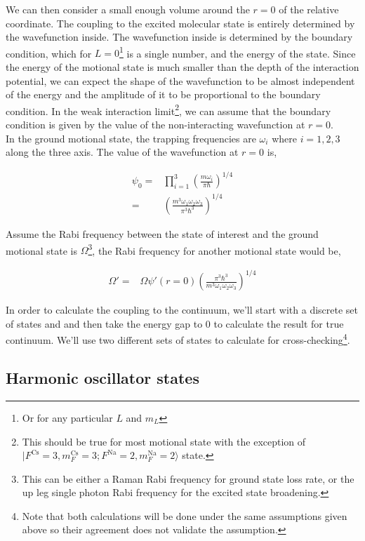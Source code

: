 \documentclass[10pt,fleqn]{article}
\newcommand{\eqar}[1]
{
  \begin{align*}
    #1
  \end{align*}
}
\newcommand{\paren}[1]{{\left({#1}\right)}}
\begin{document}
We can then consider a small enough volume around the $r=0$ of the relative coordinate.
The coupling to the excited molecular state is entirely determined by the wavefunction
inside. The wavefunction inside is determined by the boundary condition,
which for $L=0$\footnote{Or for any particular $L$ and $m_L$} is a single number,
and the energy of the state. Since the energy of the motional state is much smaller than
the depth of the interaction potential, we can expect the shape of the wavefunction
to be almost independent of the energy and the amplitude of it to be proportional to
the boundary condition. In the weak interaction limit\footnote{This should be true for most
  motional state with the exception of $|F^{\mathrm{Cs}}\!=\!3, m_{F}^{\mathrm{Cs}}\!=\!3; F^{\mathrm{Na}}\!=\!2, m_{F}^{\mathrm{Na}}\!=\!2\rangle$ state.},
we can assume that the boundary condition is given by the value of
the non-interacting wavefunction at $r=0$.\\

In the ground motional state, the trapping frequencies are $\omega_i$ where $i=1,2,3$
along the three axis. The value of the wavefunction at $r=0$ is,

\eqar{
  \psi_0=&\prod_{i=1}^{3}\paren{\frac{m\omega_i}{\pi\hbar}}^{1/4}\\
  =&\paren{\frac{m^3\omega_1\omega_2\omega_3}{\pi^3\hbar^3}}^{1/4}
}

Assume the Rabi frequency between the state of interest and the ground motional state
is $\Omega$\footnote{This can be either a Raman Rabi frequency for ground state loss rate,
  or the up leg single photon Rabi frequency for the excited state broadening.},
the Rabi frequency for another motional state would be,

\eqar{
  \Omega'=&\Omega\psi'(r=0)\paren{\frac{\pi^3\hbar^3}{m^3\omega_1\omega_2\omega_3}}^{1/4}
}

In order to calculate the coupling to the continuum, we'll start with a discrete set of states
and and then take the energy gap to $0$ to calculate the result for true continuum.
We'll use two different sets of states to calculate for cross-checking\footnote{
  Note that both calculations will be done under the same assumptions given above so their
  agreement does not validate the assumption.}.

\subsection{Harmonic oscillator states}
\end{document}
